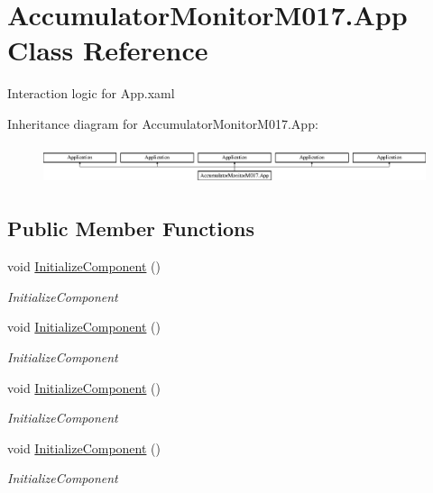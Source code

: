 \hypertarget{class_accumulator_monitor_m017_1_1_app}{}\section{Accumulator\+Monitor\+M017.\+App Class Reference}
\label{class_accumulator_monitor_m017_1_1_app}


Interaction logic for App.\+xaml  


Inheritance diagram for Accumulator\+Monitor\+M017.\+App\+:\begin{figure}[H]
\begin{center}
\leavevmode
\includegraphics[height=1.160622cm]{class_accumulator_monitor_m017_1_1_app}
\end{center}
\end{figure}
\subsection*{Public Member Functions}
\begin{DoxyCompactItemize}
\item 
void \hyperlink{class_accumulator_monitor_m017_1_1_app_a89d0010614352b3a9f2c6eb1dec315ab}{Initialize\+Component} ()
\begin{DoxyCompactList}\small\item\em Initialize\+Component \end{DoxyCompactList}\item 
void \hyperlink{class_accumulator_monitor_m017_1_1_app_a89d0010614352b3a9f2c6eb1dec315ab}{Initialize\+Component} ()
\begin{DoxyCompactList}\small\item\em Initialize\+Component \end{DoxyCompactList}\item 
void \hyperlink{class_accumulator_monitor_m017_1_1_app_a89d0010614352b3a9f2c6eb1dec315ab}{Initialize\+Component} ()
\begin{DoxyCompactList}\small\item\em Initialize\+Component \end{DoxyCompactList}\item 
void \hyperlink{class_accumulator_monitor_m017_1_1_app_a89d0010614352b3a9f2c6eb1dec315ab}{Initialize\+Component} ()
\begin{DoxyCompactList}\small\item\em Initialize\+Component \end{DoxyCompactList}\end{DoxyCompactItemize}
